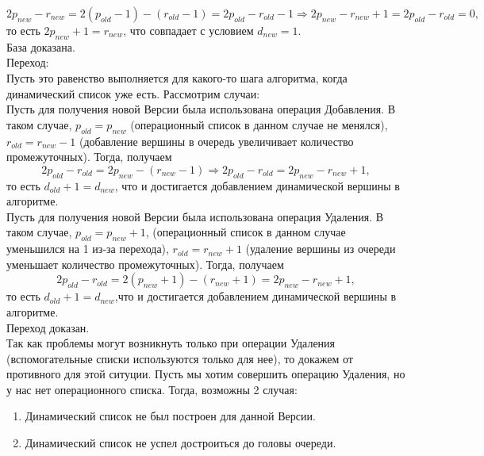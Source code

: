 \documentclass[a4paper,12pt]{extarticle}
\begin{document}
\begin{equation}
    \nonumber2p_{new} - r_{new} = 2(p_{old} - 1) - (r_{old} - 1) = 2p_{old} - r_{old} - 1 \Rightarrow 2p_{new} - r_{new} + 1 = 2p_{old} - r_{old} = 0,
\end{equation}
то есть $2p_{new} + 1 = r_{new}$, что совпадает с условием $d_{new} = 1$.\\
База доказана.\\
Переход:\\
Пусть это равенство выполняется для какого-то шага алгоритма, когда динамический список уже есть. Рассмотрим случаи:\\
Пусть для получения новой Версии была использована операция Добавления. В таком случае, $p_{old} = p_{new}$ (операционный список в данном случае не менялся), $r_{old} = r_{new} - 1$ (добавление вершины в очередь увеличивает количество промежуточных). Тогда, получаем
\begin{equation}
    \nonumber2p_{old} - r_{old} = 2p_{new} - (r_{new} - 1) \Rightarrow 2p_{old} - r_{old} = 2p_{new} - r_{new} + 1,
\end{equation}
то есть $d_{old} + 1 = d_{new}$, что и достигается добавлением динамической вершины в алгоритме.\\
Пусть для получения новой Версии была использована операция Удаления. В таком случае, $p_{old} = p_{new} + 1$, (операционный список в данном случае уменьшился на 1 из-за перехода), $r_{old} = r_{new} + 1$ (удаление вершины из очереди уменьшает количество промежуточных). Тогда, получаем
\begin{equation}
    \nonumber2p_{old} - r_{old} = 2(p_{new} + 1) - (r_{new} + 1) = 2p_{new} - r_{new} + 1,
\end{equation}
то есть $d_{old} + 1 = d_{new}$,что и достигается добавлением динамической вершины в алгоритме.\\
Переход доказан.\\
Так как проблемы могут возникнуть только при операции Удаления (вспомогательные списки используются только для нее), то докажем от противного для этой ситуции. Пусть мы хотим совершить операцию Удаления, но у нас нет операционного списка. Тогда, возможны 2 случая:
\begin{enumerate}
    \item Динамический список не был построен для данной Версии.
    \item Динамический список не успел достроиться до головы очереди.
\end{enumerate}\par
\end{document}
